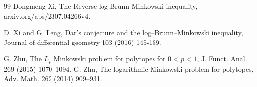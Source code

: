 \documentclass[reqno]{amsart}
\theoremstyle{remark}
\theoremstyle{plain}
\begin{document}
\begin{thebibliography}{99}
Dongmeng Xi,  The Reverse-log-Brunn-Minkowski inequality, arxiv.org/abs/2307.04266v4.


D. Xi and G. Leng, Dar’s conjecture and the log–Brunn–Minkowski inequality, Journal of differential geometry
103 (2016) 145-189.


G. Zhu, The $L_p$ Minkowski problem for polytopes for $0 <p <1$, J. Funct. Anal. 269 (2015) 1070–1094.
 G. Zhu, The logarithmic Minkowski problem for polytopes, Adv. Math. 262 (2014) 909–931.


\end{thebibliography}
\end{document}
